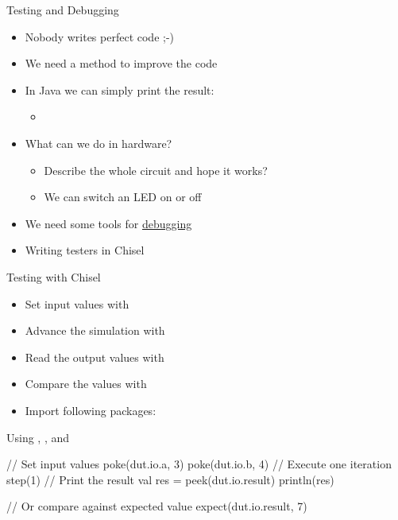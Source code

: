 \begin{frame}[fragile]{Testing and Debugging}
\begin{itemize}
\item Nobody writes perfect code ;-)
\item We need a method to improve the code
\item In Java we can simply print the result:
\begin{itemize}
\item {}
\end{itemize}
\item What can we do in hardware?
\begin{itemize}
\item Describe the whole circuit and hope it works?
\item We can switch an LED on or off
\end{itemize}
\item We need some tools for \href{https://en.wikipedia.org/wiki/Debugging#/media/File:H96566k.jpg}{debugging}
\item Writing testers in Chisel
\end{itemize}
\end{frame}

\begin{frame}[fragile]{Testing with Chisel}
\begin{itemize}
\item Set input values with 
\item Advance the simulation with 
\item Read the output values with 
\item Compare the values with 
\item Import following packages:
\end{itemize}
\end{frame}

\begin{frame}[fragile]{Using , , and }
\begin{chisel}
// Set input values
poke(dut.io.a, 3)
poke(dut.io.b, 4)
// Execute one iteration
step(1)
// Print the result
val res = peek(dut.io.result)
println(res)

// Or compare against expected value
expect(dut.io.result, 7)
\end{chisel}
\end{frame}

